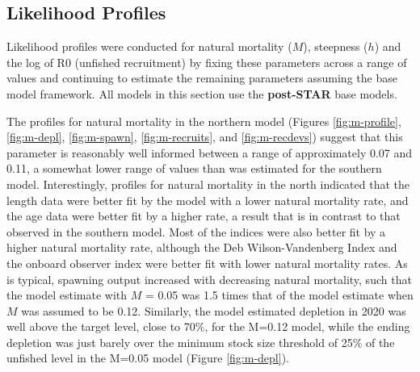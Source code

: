 \documentclass[11pt,
  english,
]{article}
\begin{document}

\hypertarget{likelihood-profiles}{%
\subsection{Likelihood Profiles}\label{likelihood-profiles}}

\leavevmode\tagmcend\tagstructend

Likelihood profiles were conducted for natural mortality ({\(M\)\leavevmode\tagmcend\tagstructend}), steepness ({\(h\)\leavevmode\tagmcend\tagstructend}) and the log of R0 (unfished recruitment) by fixing these parameters across a range of values and continuing to estimate the remaining parameters assuming the base model framework. All models in this section use the \textbf{post-STAR} base models.

The profiles for natural mortality in the northern model (Figures \ref{fig:m-profile}, \ref{fig:m-depl}, \ref{fig:m-spawn}, \ref{fig:m-recruits}, and \ref{fig:m-recdevs}) suggest that this parameter is reasonably well informed between a range of approximately 0.07 and 0.11, a somewhat lower range of values than was estimated for the southern model. Interestingly, profiles for natural mortality in the north indicated that the length data were better fit by the model with a lower natural mortality rate, and the age data were better fit by a higher rate, a result that is in contrast to that observed in the southern model. Most of the indices were also better fit by a higher natural mortality rate, although the Deb Wilson-Vandenberg Index and the onboard observer index were better fit with lower natural mortality rates. As is typical, spawning output increased with decreasing natural mortality, such that the model estimate with {\(M\)\leavevmode\tagmcend\tagstructend} = 0.05 was 1.5 times that of the model estimate when {\(M\)\leavevmode\tagmcend\tagstructend} was assumed to be 0.12. Similarly, the model estimated depletion in 2020 was well above the target level, close to 70\%, for the M=0.12 model, while the ending depletion was just barely over the minimum stock size threshold of 25\% of the unfished level in the M=0.05 model (Figure \ref{fig:m-depl}).
\end{document}
